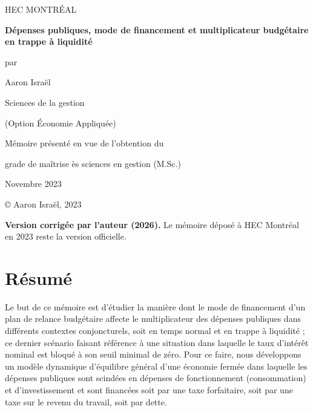 \documentclass[12pt,letterpaper]{article}
\begin{document}
\begin{titlepage}
\centering
{\large HEC MONTRÉAL\par}
\vspace{2cm}
{\LARGE\bfseries Dépenses publiques, mode de financement et multiplicateur budgétaire en trappe à liquidité\par}
\vspace{1cm}
par\par
\vspace{0.3cm}
{\large Aaron Israël\par}
\vspace{1.5cm}
Sciences de la gestion\par
(Option Économie Appliquée)\par
\vspace{1.5cm}
Mémoire présenté en vue de l’obtention du\par
grade de maîtrise ès sciences en gestion (M.Sc.)\par
\vspace{1.5cm}
Novembre 2023\par
\copyright{} Aaron Israël, 2023\par
\vfill
{\small \textbf{Version corrigée par l’auteur (2026).} Le mémoire déposé à HEC Montréal en 2023 reste la version officielle.\par}
\end{titlepage}

\setcounter{page}{3}

\section*{Résumé}

Le but de ce mémoire est d’étudier la manière dont le mode de financement d’un plan de relance budgétaire affecte le multiplicateur des dépenses publiques dans différents contextes conjoncturels, soit en temps normal et en trappe à liquidité ; ce dernier scénario faisant référence à une situation dans laquelle le taux d’intérêt nominal est bloqué à son seuil minimal de zéro. Pour ce faire, nous développons un modèle dynamique d’équilibre général d’une économie fermée dans laquelle les dépenses publiques sont scindées en dépenses de fonctionnement (consommation) et d’investissement et sont financées soit par une taxe forfaitaire, soit par une taxe sur le revenu du travail, soit par dette.
\end{document}
